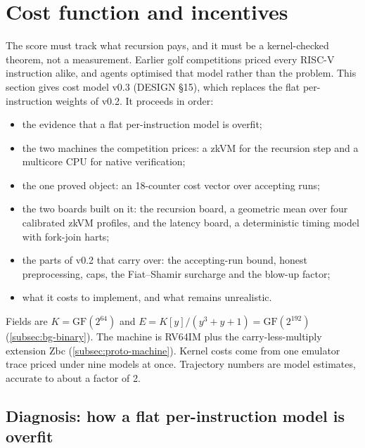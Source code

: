\section{Cost function and incentives}\label{sec:cost}

The score must track what recursion pays, and it must be a kernel-checked theorem, not a
measurement. Earlier golf competitions priced every RISC-V instruction alike, and agents optimised
that model rather than the problem. This section gives cost model v0.3 (DESIGN §15), which replaces
the flat per-instruction weights of v0.2. It proceeds in order:
\begin{itemize}[nosep]
\item the evidence that a flat per-instruction model is overfit;
\item the two machines the competition prices: a zkVM for the recursion step and a multicore CPU for
  native verification;
\item the one proved object: an 18-counter cost vector over accepting runs;
\item the two boards built on it: the recursion board, a geometric mean over four calibrated zkVM
  profiles, and the latency board, a deterministic timing model with fork-join harts;
\item the parts of v0.2 that carry over: the accepting-run bound, honest preprocessing, caps, the
  Fiat--Shamir surcharge and the blow-up factor;
\item what it costs to implement, and what remains unrealistic.
\end{itemize}
Fields are $K=\mathrm{GF}(2^{64})$ and $E=K[y]/(y^3+y+1)=\mathrm{GF}(2^{192})$
(\cref{subsec:bg-binary}). The machine is RV64IM plus the carry-less-multiply extension Zbc
(\cref{subsec:proto-machine}). Kernel costs come from one emulator trace priced under nine models at once.
Trajectory numbers are model estimates, accurate to about a factor of 2.

\subsection{Diagnosis: how a flat per-instruction model is overfit}\label{subsec:cost-diagnosis}

